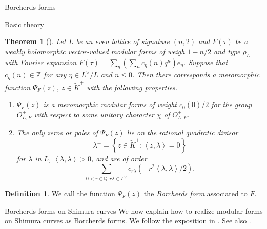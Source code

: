 \documentclass{amsart}
\newcounter{lemma}
\newtheorem{theorem}{Theorem}
\theoremstyle{definition}
\newtheorem{Definition}[lemma]{Definition}
\def\Q{\mathbb Q}
\def\Z{\mathbb Z}
\begin{document}
\begin{section}{Borcherds forms}
\begin{subsection}{Basic theory}
\begin{theorem}[{\cite[Theorem 13.3]{Borcherds-Invent}}]\label{B}
Let $L$ be an even lattice of signature $(n,2)$ and $F(\tau)$ be a
weakly holomorphic vector-valued modular forms of weigh $1-{n}/{2}$
and type $\rho_L$ with Fourier expansion $ F(\tau)=\sum_{\eta}\left(
  \sum_{n}c_{\eta}(n)q^n\right){e_{\eta}}$. Suppose that
$c_{\eta}(n)\in\Z$ for any $\eta\in L^{\vee}/L$ and $n\leq 0$. Then
there corresponds a meromorphic function $\Psi_F(z),\ z\in
\widetilde{K}^+$ with the following properties.
\begin{enumerate}
\item[(i)] $\Psi_F(z)$ is a meromorphic modular forms of weight $c_0(0)/2$
  for the group ${O}^+_{L,F}$ with respect to some unitary character
  $\chi$ of ${O}^+_{L,F}$.
\item[(ii)] The only zeros or poles of $\Psi_F(z)$ lie on the rational
  quadratic divisor 
$$
  \lambda^{\perp}=\left\{z\in\widetilde{K}^+:\left\langle z,\lambda
  \right\rangle=0\right\}
$$
for $\lambda$ in $L$, $\left\langle \lambda,\lambda\right\rangle>0$,
and are of order
$$
  \sum_{0<r\in \Q,r\lambda\in
    L^{\vee}}c_{r\lambda}\left(-r^2\left\langle
  \lambda,\lambda \right\rangle/2\right).
$$
\end{enumerate}
\end{theorem}
\begin{Definition}
We call the function $\Psi_F(z)$ the \emph{Borcherds form} associated to $F$.
\end{Definition}

\end{subsection}

\begin{subsection}{Borcherds forms on Shimura curves}
\label{subsection: Borcherds on Shimura}
We now explain how to realize modular forms on Shimura curves as
Borcherds forms. We follow the exposition in \cite{Yang-CM}. See also
\cite{Errthum}.


\end{subsection}
\end{section}
\end{document}
